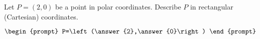 \documentclass{ximera}
\author{Gregory Hartman \and Matthew Carr}
\begin{document}
\begin{exercise}





Let $P=(2,0)$ be a point in polar coordinates. Describe $P$ in rectangular (Cartesian) coordinates.

\[
\begin{prompt}
P=\left(\answer{2},\answer{0}\right)
\end{prompt}
\]

\end{exercise}
\end{document}

